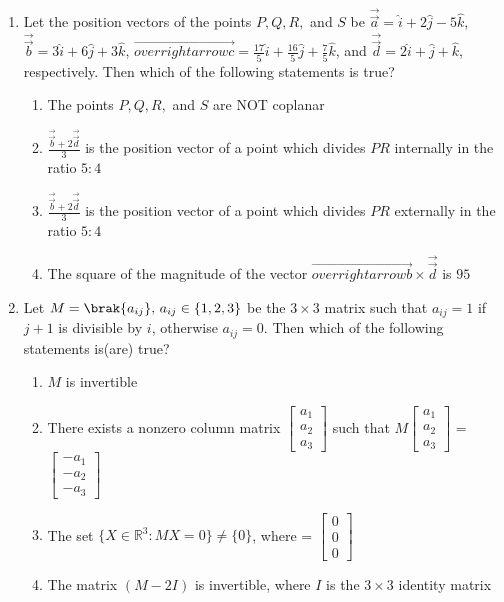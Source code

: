 \documentclass[12pt,a4paper]{article}
\begin{document}
\begin{enumerate}
\item Let the position vectors of the points $P, Q, R,$ and $S$ be
$\vec{\overrightarrow{a}} = \hat{i} + 2\hat{j} - 5\hat{k}$, $\vec{\overrightarrow{b}} = 3\hat{i} + 6\hat{j} + 3\hat{k}$, $\vec{overrightarrow{c}} = \frac{17}{5}\hat{i} + \frac{16}{5}\hat{j} + \frac{7}{5}\hat{k}$, and $\vec{\overrightarrow{d}} = 2\hat{i} + \hat{j} + \hat{k}$, respectively. Then which of the following statements is true?
\begin{enumerate}[label=\Alph*.]
\item The points $P, Q, R,$ and $S$ are NOT coplanar
\item $\frac{\vec{\overrightarrow{b}} + 2\vec{\overrightarrow{d}}}{3}$ is the position vector of a point which divides $PR$ internally in the ratio $5:4$
\item $\frac{\vec{\overrightarrow{b}} + 2\vec{\overrightarrow{d}}}{3}$ is the position vector of a point which divides $PR$ externally in the ratio $5:4$
\item The square of the magnitude of the vector $\vec{overrightarrow{b}} \times \vec{\overrightarrow{d}}$ is $95$
\end{enumerate}

\item Let $M = \brak{ a_{ij} }, \, a_{ij} \in \{1,2,3\}$ be the $3 \times 3$ matrix such that $a_{ij} = 1$ if $j + 1$ is divisible by $i$, otherwise $a_{ij} = 0$. Then which of the following statements is(are) true?
\begin{enumerate}[label=\Alph*.]
\item $M$ is invertible
\item There exists a nonzero column matrix
$\begin{bmatrix} a_1 \\ a_2 \\ a_3 \end{bmatrix}$ such that $M \begin{bmatrix} a_1 \\ a_2 \\ a_3\end{bmatrix}$ = $\begin{bmatrix} -a_1 \\ -a_2 \\ -a_3 \end{bmatrix}$
\item The set $\{ X \in \mathbb{R}^3 : MX = 0 \} \neq \{0\}$, where = $\begin{bmatrix} 0 \\ 0 \\ 0 \end{bmatrix}$
\item The matrix $(M - 2I)$ is invertible, where $I$ is the $3 \times 3$ identity matrix
\end{enumerate}


\end{enumerate}
\end{document}
